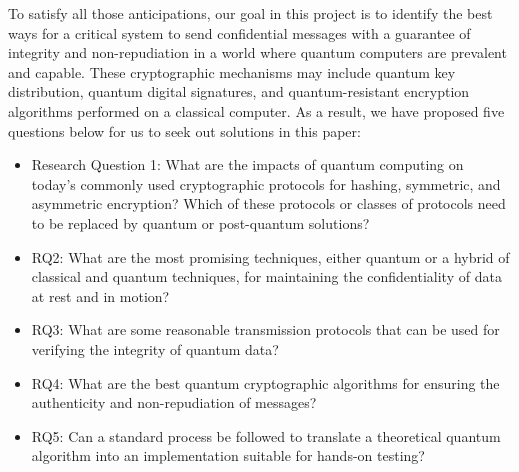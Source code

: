 \documentclass[sigconf]{acmart}
\begin{document}
To satisfy all those anticipations, our goal in this project is to identify the best ways for a critical system to send confidential messages with a guarantee of integrity and non-repudiation in a world where quantum computers are prevalent and capable. These cryptographic mechanisms may include quantum key distribution, quantum digital signatures, and quantum-resistant encryption algorithms performed on a classical computer. As a result, we have proposed five questions below for us to seek out solutions in this paper: %
\begin{itemize}
\item Research Question 1: What are the impacts of quantum computing on today's commonly used cryptographic protocols for hashing, symmetric, and asymmetric encryption? Which of these protocols or classes of protocols need to be replaced by quantum or post-quantum solutions?
\item RQ2: What are the most promising techniques, either quantum or a hybrid of classical and quantum techniques, for maintaining the confidentiality of data at rest and in motion?
\item RQ3: What are some reasonable transmission protocols that can be used for verifying the integrity of quantum data?
\item RQ4: What are the best quantum cryptographic algorithms for ensuring the authenticity and non-repudiation of messages?
\item RQ5: Can a standard process be followed to translate a theoretical quantum algorithm into an implementation suitable for hands-on testing?
\end{itemize}

\end{document}
